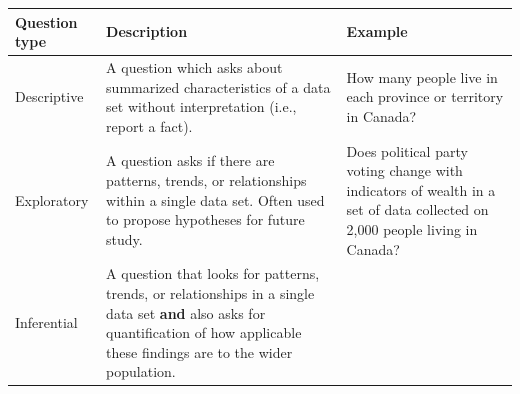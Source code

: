 \documentclass[
]{krantz}
\begin{document}
\begin{longtable}[]{@{}lll@{}}
\toprule
\begin{minipage}[b]{0.37\columnwidth}\raggedright
Question type\strut
\end{minipage} & \begin{minipage}[b]{0.32\columnwidth}\raggedright
Description\strut
\end{minipage} & \begin{minipage}[b]{0.22\columnwidth}\raggedright
Example\strut
\end{minipage}\tabularnewline
\midrule
\endhead
\begin{minipage}[t]{0.37\columnwidth}\raggedright
Descriptive\strut
\end{minipage} & \begin{minipage}[t]{0.32\columnwidth}\raggedright
A question which asks about summarized characteristics of a data set without interpretation (i.e., report a fact).\strut
\end{minipage} & \begin{minipage}[t]{0.22\columnwidth}\raggedright
How many people live in each province or territory in Canada?\strut
\end{minipage}\tabularnewline
\begin{minipage}[t]{0.37\columnwidth}\raggedright
Exploratory\strut
\end{minipage} & \begin{minipage}[t]{0.32\columnwidth}\raggedright
A question asks if there are patterns, trends, or relationships within a single data set. Often used to propose hypotheses for future study.\strut
\end{minipage} & \begin{minipage}[t]{0.22\columnwidth}\raggedright
Does political party voting change with indicators of wealth in a set of data collected on 2,000 people living in Canada?\strut
\end{minipage}\tabularnewline
\begin{minipage}[t]{0.37\columnwidth}\raggedright
Inferential\strut
\end{minipage} & \begin{minipage}[t]{0.32\columnwidth}\raggedright
A question that looks for patterns, trends, or relationships in a single data set \textbf{and} also asks for quantification of how applicable these findings are to the wider population.\strut
\end{minipage} & \begin{minipage}[t]{0.22\columnwidth}\raggedright

\end{minipage}
\end{longtable}
\end{document}
